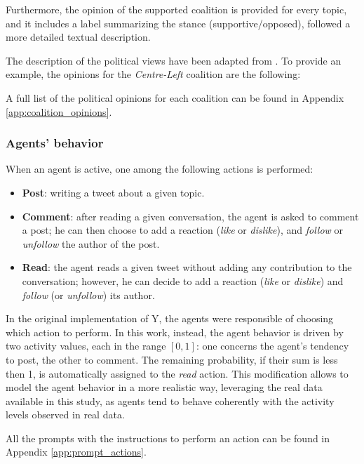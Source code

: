 Furthermore, the opinion of the supported coalition is provided for every topic, and it includes a label summarizing the stance (supportive/opposed), followed a more detailed textual description.

The description of the political views have been adapted from \cite{wired2022elezioni12punti, ilpost2022partiti, pagellapolitica2022confronto, pagellapolitica2022programmi}.
To provide an example, the opinions for the \textit{Centre-Left} coalition are the following:



A full list of the political opinions for each coalition can be found in Appendix \ref{app:coalition_opinions}.



\subsubsection{Agents' behavior}
When an agent is active, one among the following actions is performed:
\begin{itemize}
    \item \textbf{Post}: writing a tweet about a given topic.
    \item \textbf{Comment}: after reading a given conversation, the agent is asked to comment a post; he can then choose to add a reaction (\textit{like} or \textit{dislike}), and \textit{follow} or \textit{unfollow} the author of the post.
    \item \textbf{Read}: the agent reads a given tweet without adding any contribution to the conversation; however, he can decide to add a reaction (\textit{like} or \textit{dislike}) and \textit{follow} (or \textit{unfollow}) its author.
\end{itemize}

\medskip
In the original implementation of Y, the agents were responsible of choosing which action to perform.
In this work, instead, the agent behavior is driven by two activity values, each in the range $[0,1]$: one concerns the agent's tendency to post, the other to comment. 
The remaining probability, if their sum is less then 1, is automatically assigned to the \textit{read} action.
This modification allows to model the agent behavior in a more realistic way, leveraging the real data available in this study, as agents tend to behave coherently with the activity levels observed in real data.

All the prompts with the instructions to perform an action can be found in Appendix \ref{app:prompt_actions}.

